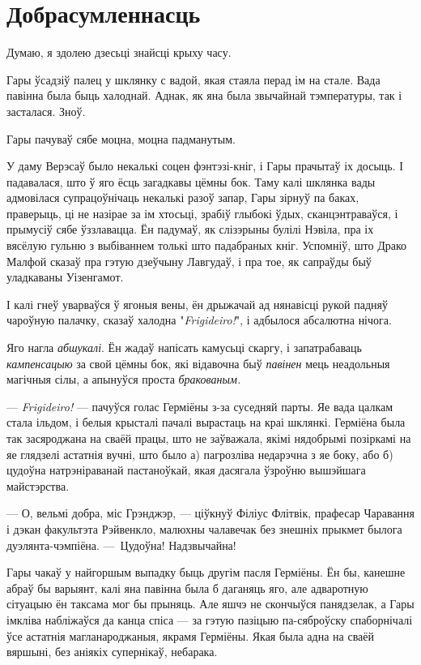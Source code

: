 \chapter{Добрасумленнасць}

\begin{chapterOpeningQuote}
Думаю, я здолею дзесьці знайсці крыху часу.
\end{chapterOpeningQuote}


\hplettrineextrapara
Гары ўсадзіў палец у шклянку с вадой, якая стаяла перад ім на стале. Вада павінна была
быць халоднай. Аднак, як яна была звычайнай тэмпературы, так і засталася. Зноў.

Гары пачуваў сябе моцна, моцна падманутым.

У даму Верэсаў было некалькі соцен фэнтэзі-кніг, і Гары прачытаў іх досыць. І 
падавалася, што ў яго ёсць загадкавы цёмны бок. Таму калі шклянка вады адмовілася
супрацоўнічаць некалькі разоў запар, Гары зірнуў па баках, праверыць, ці не назірае 
за ім хтосьці, зрабіў глыбокі ўдых, сканцэнтраваўся, і прымусіў сябе ўззлавацца.
Ён падумаў, як слізэрыны булілі Нэвіла, пра іх вясёлую гульню з выбіваннем толькі 
што падабраных кніг. Успомніў, што Драко Малфой сказаў пра гэтую дзеўчыну Лавгудаў, 
і пра тое, як сапраўды быў уладкаваны Уізенгамот.

І калі гнеў уварваўся ў ягоныя вены, ён дрыжачай ад нянавісці рукой падняў чароўную
палачку, сказаў халодна "\emph{Frigideiro!}", і адбылося абсалютна нічога.

Яго нагла \emph{абшукалі}. Ён жадаў напісать камусьці скаргу, і запатрабаваць
\emph{кампенсацыю} за свой цёмны бок, які відавочна быў \emph{павінен} мець 
неадольныя магічныя сілы, а апынуўся проста \emph{бракованым.}

--- \emph{Frigideiro!} --- пачуўся голас Герміёны з-за суседняй парты. Яе вада 
цалкам стала ільдом, і белыя крысталі пачалі вырастаць на краі шклянкі. 
Герміёна была так засяроджана на сваёй працы, што не заўважала, якімі нядобрымі 
позіркамі на яе глядзелі астатнія вучні, што было а) пагрозліва недарэчна з яе боку, або
б) цудоўна натрэніраванай пастаноўкай, якая дасягала ўзроўню вышэйшага майстэрства.

--- О, вельмі добра, міс Грэнджэр, --- ціўкнуў Філіус Флітвік, прафесар Чаравання і
дэкан факультэта Рэйвенкло, малюхны чалавечак без знешніх прыкмет былога дуэлянта-чэмпіёна.
---~Цудоўна! Надзвычайна!

Гары чакаў у найгоршым выпадку быць другім пасля Герміёны. Ён бы, канешне абраў 
бы варыянт, калі яна павінна была б даганяць яго, але адваротную сітуацыю ён таксама 
мог бы прыняць. Але яшчэ не скончыўся панядзелак, а Гары імкліва набліжаўся да 
канца спіса --- за гэтую пазіцыю 
па-сяброўску спаборнічалі ўсе астатнія магланароджаныя, якрамя Герміёны.
Якая была адна на сваёй вяршыні, без аніякіх супернікаў, небарака.

